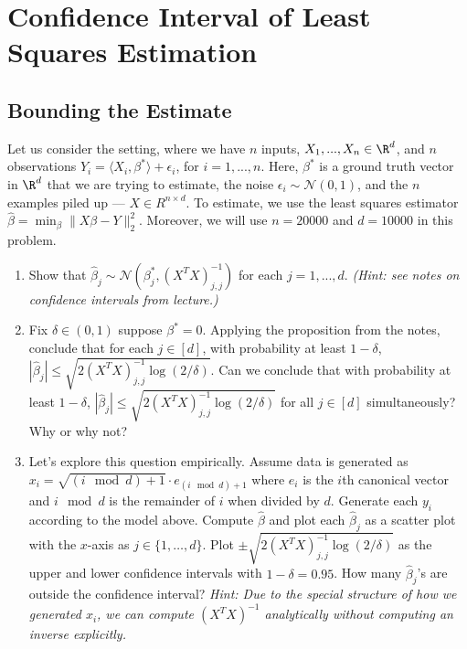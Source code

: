 \documentclass{article}
\begin{document}
\section*{Confidence Interval of Least Squares Estimation}
\subsection*{Bounding the Estimate} 
\begin{bprob}
    Let us consider the setting, where we have $n$ inputs, $X_1, ..., X_n \in \R^d$, and $n$ observations $Y_i = \langle X_i, \beta^* \rangle + \epsilon_i$, for $i = 1, ..., n$. Here, $\beta^*$ is a ground truth vector in $\R^d$ that we are trying to estimate, the noise $\epsilon_i \sim \mathcal{N}(0, 1)$, and the $n$ examples piled up --- $X \in R^{n\times d}$. To estimate, we use the least squares estimator $\widehat{\beta} = \min_\beta \lVert X\beta - Y\rVert_2^2$. Moreover, we will use $n=20000$ and $d=10000$ in this problem.

    \begin{enumerate}
        \item {} Show that $\widehat{\beta}_j \sim \mathcal{N}(\beta_j^*, (X^T X)^{-1}_{j, j})$ for each $j = 1, ..., d$. \emph{(Hint: see notes on confidence intervals from lecture.)}
        \item {} Fix $\delta \in (0,1)$ suppose $\beta^* = 0$. Applying the proposition from the notes, conclude that for each $j \in [d]$, with probability at least $1-\delta$, $|\widehat{\beta}_j| \leq \sqrt{2(X^TX)^{-1}_{j, j} \log(2 / \delta)}$.
        Can we conclude that with probability at least $1-\delta$,  $|\widehat{\beta}_j| \leq \sqrt{2(X^TX)^{-1}_{j, j} \log(2 / \delta)}$ for all $j \in [d]$ simultaneously? Why or why not?
        \item {} Let's explore this question empirically. Assume data is generated as $x_i = \sqrt{(i \mod d) + 1} \cdot e_{(i \mod d) + 1}$ where $e_i$ is the $i$th canonical vector and $i \mod d$ is the remainder of $i$ when divided by $d$. Generate each $y_i$ according to the model above. 
        Compute $\widehat{\beta}$ and plot each $\widehat{\beta}_j$ as a scatter plot with the $x$-axis as $j \in \{1,\dots,d\}$. Plot $\pm \sqrt{2(X^TX)^{-1}_{j, j} \log(2 / \delta)}$ as the upper and lower confidence intervals with $1 - \delta = 0.95$. How many $\widehat{\beta}_j$'s are outside the confidence interval?  \emph{Hint: Due to the special structure of how we generated $x_i$, we can compute $(X^TX)^{-1}$ analytically without computing an inverse explicitly.}
        

\end{enumerate}
\end{bprob}
\end{document}
